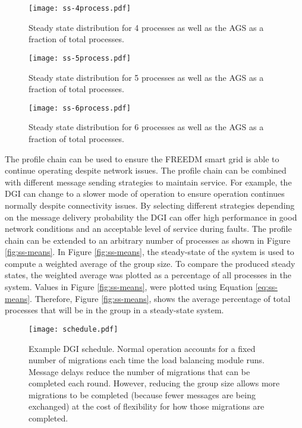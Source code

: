 \begin{figure}
    \centering
    \texttt{[image: ss-4process.pdf]}
    \caption{Steady state distribution for 4 processes as well as the \ac{AGS} as a fraction of total processes.}
    \label{fig:ss-4process}
\end{figure}

\begin{figure}
    \centering
    \texttt{[image: ss-5process.pdf]}
    \caption{Steady state distribution for 5 processes as well as the \ac{AGS} as a fraction of total processes.}
    \label{fig:ss-5process}
\end{figure}

\begin{figure}
    \centering
    \texttt{[image: ss-6process.pdf]}
    \caption{Steady state distribution for 6 processes as well as the \ac{AGS} as a fraction of total processes.}
    \label{fig:ss-6process}
\end{figure}

The profile chain can be used to ensure the \ac{FREEDM} smart grid is able to continue operating despite network issues.
The profile chain can be combined with different message sending strategies to maintain service.
For example, the DGI can change to a slower mode of operation to ensure operation continues normally despite connectivity issues.
By selecting different strategies depending on the message delivery probability the DGI can offer high performance in good network conditions and an acceptable level of service during faults.
The profile chain can be extended to an arbitrary number of processes as shown in Figure \ref{fig:ss-means}.
In Figure \ref{fig:ss-means}, the steady-state of the system is used to compute a weighted average of the group size.
To compare the produced steady states, the weighted average was plotted as a percentage of all processes in the system.
Values in Figure \ref{fig:ss-means}, were plotted using Equation \ref{eq:ss-means}.
Therefore, Figure \ref{fig:ss-means}, shows the average percentage of total processes that will be in the group in a steady-state system.

\begin{figure}
    \centering
    \texttt{[image: schedule.pdf]}
    \caption{Example DGI schedule. Normal operation accounts for a fixed number of migrations each time the load balancing module runs. Message delays reduce the number of migrations that can be completed each round. However, reducing the group size allows more migrations to be completed (because fewer messages are being exchanged) at the cost of flexibility for how those migrations are completed.}
    \label{fig:schedule}
\end{figure}

